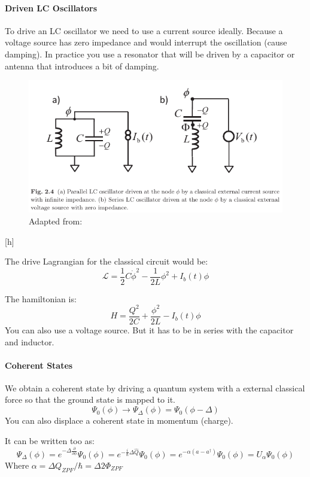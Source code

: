 \documentclass[12pt]{article}
\numberwithin{equation}{subsection}
\newcommand\page[1]{
{
}
}
\begin{document}
 \paragraph{Driven LC Oscillators\\}
To drive an LC oscillator we need to use a current source ideally. Because a voltage source has zero impedance and would interrupt the oscillation (cause damping). In practice you use a resonator that will be driven by a capacitor or antenna that introduces a bit of damping. 

\begin{figure}[h]
\includegraphics[scale=3]{images/15-driven-lc.png}
\caption{Adapted from: \cite{Girvin2015CircuitQS}}
\end{figure}[h]

The drive Lagrangian for the classical circuit would be:
\begin{equation}
    \mathcal L = \frac{1}{2} C\dot \phi ^2 - \frac{1}{2L} \phi^2+I_b(t)\phi
\end{equation}

The hamiltonian is:
 \begin{equation}
     H = \frac{Q^2}{2C} + \frac{\phi^2}{2L} - I_b(t)\phi
 \end{equation}
 You can also use a voltage source. But it has to be in series with the capacitor and inductor.
 \paragraph{Coherent States\\}
 We obtain a coherent state by driving a quantum system with a external classical force so that the ground state is mapped to it.
 \begin{equation}
     \Psi_0(\phi) \rightarrow \Psi_\Delta (\phi) = \Psi_0(\phi-\Delta)
 \end{equation}
 You can also displace a coherent state in momentum (charge).
 \page{17}
 It can be written too as:
 \begin{equation}
     \Psi_\Delta (\phi) =e^{-\Delta\frac{\partial}{\partial \phi}} \Psi_0 (\phi) = e^{-\frac{i}{\hbar}\Delta\hat Q} \Psi_0 (\phi) = e^{-\alpha (a-a^\dagger)} \Psi_0 (\phi) = U_\alpha \Psi_0 (\phi)
 \end{equation}
 Where $\alpha = \Delta Q_{ZPF}/\hbar = \Delta 2\Phi_{ZPF}$
 
\end{document}
